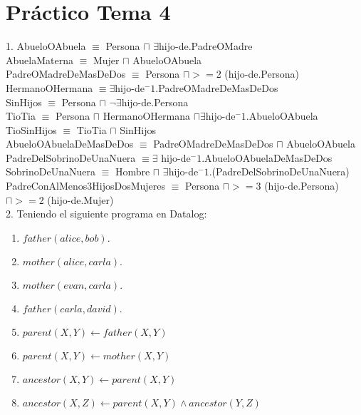 \chapter{Práctico Tema 4}

1. AbueloOAbuela $\equiv$ Persona $\sqcap$ $\exists$hijo-de.PadreOMadre\\ 

AbuelaMaterna $\equiv$ Mujer $\sqcap$ AbueloOAbuela\\


PadreOMadreDeMasDeDos $\equiv$ Persona $\sqcap >= $2 (hijo-de.Persona)\\

HermanoOHermana $\equiv \exists$hijo-de$^-1$.PadreOMadreDeMasDeDos\\

SinHijos $\equiv$ Persona $\sqcap$ $\neg \exists$hijo-de.Persona\\

TioTia $\equiv$ Persona $\sqcap$ HermanoOHermana $\sqcap \exists$hijo-de$^-1$.AbueloOAbuela\\

TioSinHijos $\equiv$ TioTia $\sqcap$ SinHijos\\


AbueloOAbuelaDeMasDeDos $\equiv$ PadreOMadreDeMasDeDos $\sqcap$ AbueloOAbuela\\

PadreDelSobrinoDeUnaNuera $\equiv \exists$ hijo-de$^-1$.AbueloOAbuelaDeMasDeDos \\

SobrinoDeUnaNuera $\equiv$ Hombre $\sqcap$ $\exists$hijo-de$^-1$.(PadreDelSobrinoDeUnaNuera)\\


PadreConAlMenos3HijosDosMujeres $\equiv$ Persona $\sqcap >=$3 (hijo-de.Persona) $\sqcap >=$2 (hijo-de.Mujer)\\



2. Teniendo el siguiente programa en Datalog: \\

\begin{enumerate}
	\item $father(alice, bob).$
	\item $mother(alice, carla).$
	\item $mother(evan, carla).$
	\item $father(carla, david).$

	\item $parent(X, Y) \gets father(X, Y)$
	\item $parent(X, Y) \gets mother(X, Y)$
	\item $ancestor(X, Y) \gets parent(X, Y)$
	\item $ancestor(X,Z) \gets parent(X, Y) \land ancestor(Y, Z)$
\end{enumerate}


